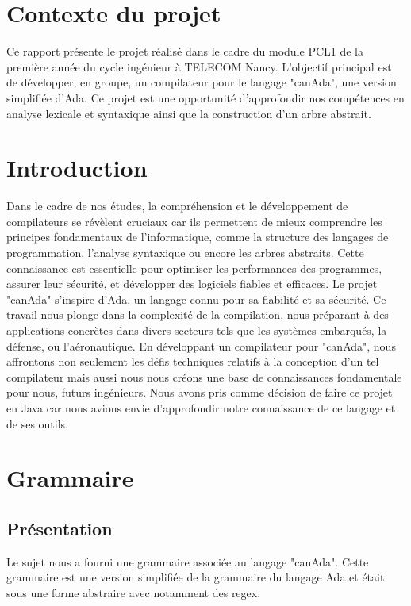 \documentclass[french,a4paper]{article}
\begin{document}
    \section{Contexte du projet}\label{sec:contexte-du-projet}
    Ce rapport présente le projet réalisé dans le cadre du module PCL1 de la première année du cycle ingénieur à TELECOM Nancy. L'objectif principal est de développer, en groupe, un compilateur pour le langage "canAda", une version simplifiée d'Ada. Ce projet est une opportunité d'approfondir nos compétences en analyse lexicale et syntaxique ainsi que la construction d'un arbre abstrait.

    \section{Introduction}\label{sec:introduction}
    Dans le cadre de nos études, la compréhension et le développement de compilateurs se révèlent cruciaux car ils permettent de mieux comprendre les principes fondamentaux de l'informatique, comme la structure des langages de programmation, l'analyse syntaxique ou encore les arbres abstraits. Cette connaissance est essentielle pour optimiser les performances des programmes, assurer leur sécurité, et développer des logiciels fiables et efficaces. Le projet "canAda" s'inspire d'Ada, un langage connu pour sa fiabilité et sa sécurité. Ce travail nous plonge dans la complexité de la compilation, nous préparant à des applications concrètes dans divers secteurs tels que les systèmes embarqués, la défense, ou l'aéronautique. En développant un compilateur pour "canAda", nous affrontons non seulement les défis techniques relatifs à la conception d'un tel compilateur mais aussi nous nous créons une base de connaissances fondamentale pour nous, futurs ingénieurs.
    Nous avons pris comme décision de faire ce projet en Java car nous avions envie d'approfondir notre connaissance de ce langage et de ses outils.

    \section{Grammaire}\label{sec:grammaire}

    \subsection{Présentation}\label{subsec:presentation}
    Le sujet nous a fourni une grammaire associée au langage "canAda". Cette grammaire est une version simplifiée de la grammaire du langage Ada et était sous une forme abstraire avec notamment des regex.
\end{document}
